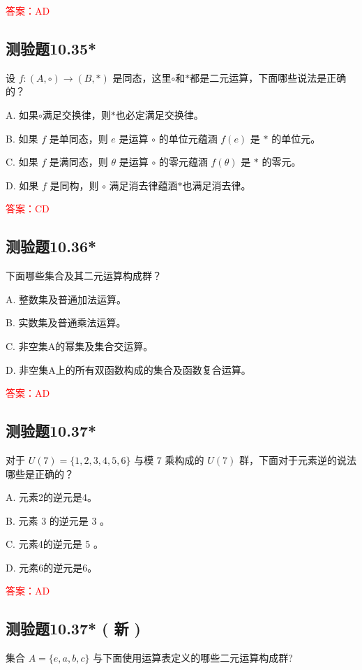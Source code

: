 \documentclass[UTF8, heading=true]{ctexart}
\begin{document}
\textcolor{red}{答案：AD}

\subsection{测验题10.35*}

设 $f:(A, \circ) \rightarrow(B, *)$ 是同态，这里$\circ$和$*$都是二元运算，下面哪些说法是正确的？

A. 如果$\circ$满足交换律，则$*$也必定满足交换律。

B. 如果 $f$ 是单同态，则 $e$ 是运算 $\circ$ 的单位元蕴涵 $f(e)$ 是 $*$ 的单位元。

C. 如果 $f$ 是满同态，则 $\theta$ 是运算 $\circ$ 的零元蕴涵 $f(\theta)$ 是 $*$ 的零元。

D. 如果 $f$ 是同构，则 $\circ$ 满足消去律蕴涵$*$也满足消去律。

\textcolor{red}{答案：CD}

\subsection{测验题10.36*}

下面哪些集合及其二元运算构成群？

A. 整数集及普通加法运算。

B. 实数集及普通乘法运算。

C. 非空集A的幂集及集合交运算。

D. 非空集A上的所有双函数构成的集合及函数复合运算。

\textcolor{red}{答案：AD}

\subsection{测验题10.37*}

对于 $U(7)=\{1,2,3,4,5,6\}$ 与模 7 乘构成的 $U(7)$ 群，下面对于元素逆的说法哪些是正确的？

A. 元素2的逆元是4。

B. 元素 3 的逆元是 3 。

C. 元素4的逆元是 5 。

D. 元素6的逆元是6。

\textcolor{red}{答案：AD}

\subsection{测验题10.37* ( 新 )}

集合 $A=\{e, a, b, c\}$  与下面使用运算表定义的哪些二元运算构成群?
\end{document}

